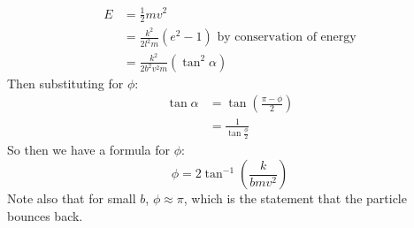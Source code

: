 \documentclass[../Main.tex]{subfiles}
\begin{document}
\begin{align*}
    E &= \frac{1}{2}m v^2 \\
    &= \frac{k^2}{2l^2m}(e^2-1) \text{ by conservation of energy} \\
    &= \frac{k^2}{2b^2v^2m}(\tan^2{\alpha})
\end{align*}
Then substituting for $\phi$:
\begin{align*}
    \tan{\alpha} &= \tan{\left(\frac{\pi-\phi}{2}\right)} \\
    &= \frac{1}{\tan{\frac{\phi}{2}}}
\end{align*}
So then we have a formula for $\phi$:
\begin{equation}
    \phi = 2\tan^{-1} \left(\frac{k}{bmv^2}\right)
    \label{eqnScatteringAngle}
\end{equation}
Note also that for small $b$, $\phi \approx \pi$, which is the statement that the particle bounces back.
\end{document}
